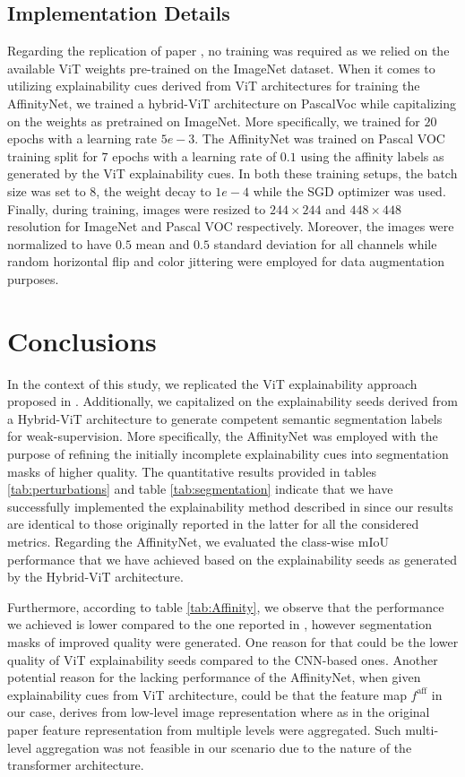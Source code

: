 \subsection{Implementation Details}
Regarding the replication of paper \cite{mainpaper}, no training was required as we relied on the available ViT weights pre-trained on the ImageNet dataset. When it comes to utilizing explainability cues derived from ViT architectures for training the AffinityNet, we trained a hybrid-ViT architecture on PascalVoc while capitalizing on the weights as pretrained on ImageNet. More specifically, we trained for $20$ epochs with a learning rate $5e-3$. The AffinityNet was trained on Pascal VOC training split for $7$ epochs with a learning rate of $0.1$ using the affinity labels as generated by the ViT explainability cues. In both these training setups, the batch size was set to $8$, the weight decay to $1e-4$ while the SGD optimizer was used. Finally, during training, images were resized to $244\times244$ and $448\times448$ resolution for ImageNet and Pascal VOC respectively. Moreover, the images were normalized to have $0.5$ mean and $0.5$ standard deviation for all channels while  random horizontal flip and color jittering were employed for data augmentation purposes.

\section{Conclusions}
In the context of this study, we replicated the ViT explainability approach proposed in \cite{mainpaper}. Additionally, we capitalized on the explainability seeds derived from a Hybrid-ViT architecture to generate competent semantic segmentation labels for weak-supervision. More specifically, the AffinityNet \cite{ahn2018learning} was employed with the purpose of refining the initially incomplete explainability cues into segmentation masks of higher quality. The quantitative results provided in tables \ref{tab:perturbations} and table \ref{tab:segmentation} indicate that we have successfully implemented the explainability method described in \cite{mainpaper} since our results are identical to those originally reported in the latter for all the considered metrics. Regarding the AffinityNet, we evaluated the class-wise mIoU performance that we have achieved based on the explainability seeds as generated by the Hybrid-ViT architecture. 

Furthermore, according to table \ref{tab:Affinity}, we observe that the performance we achieved is lower compared to the one reported in \cite{ahn2018learning}, however segmentation masks of improved quality were generated. One reason for that could be the lower quality of ViT explainability seeds compared to the CNN-based ones. Another potential reason for the lacking performance of the AffinityNet, when given explainability cues from ViT architecture, could be that the feature map $f^\text{aff}$ in our case, derives from low-level image representation where as in the original paper \cite{ahn2018learning} feature representation from multiple levels were aggregated. Such multi-level aggregation was not feasible in our scenario due to the nature of the transformer architecture. 

